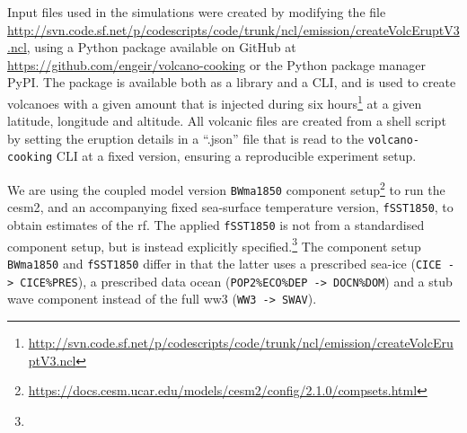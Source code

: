 \documentclass{ametsocV6.1}
\begin{document}





%



\appendix

\appendix[A]


Input files used in the simulations were created by modifying the file
\url{http://svn.code.sf.net/p/codescripts/code/trunk/ncl/emission/createVolcEruptV3.ncl},
using a Python package available on GitHub at
\url{https://github.com/engeir/volcano-cooking} or the Python package manager PyPI\@.
The package is available both as a library and a CLI, and is used to create volcanoes
with a given  amount that is injected during six
hours\footnote{\url{http://svn.code.sf.net/p/codescripts/code/trunk/ncl/emission/createVolcEruptV3.ncl}}
at a given latitude, longitude and altitude. All volcanic  files are created
from a shell script by setting the eruption details in a ``.json'' file that is read to
the \texttt{volcano-cooking} CLI at a fixed version, ensuring a reproducible experiment
setup.

We are using the coupled model version \texttt{BWma1850} component
setup\footnote{\url{https://docs.cesm.ucar.edu/models/cesm2/config/2.1.0/compsets.html}}
to run the \gls{cesm2}, and an accompanying fixed sea-surface temperature version,
\texttt{fSST1850}, to obtain estimates of the \gls{rf}. The applied \texttt{fSST1850} is
not from a standardised component setup, but is instead explicitly
specified.\footnote{\fssturl} The component setup \texttt{BWma1850} and
\texttt{fSST1850} differ in that the latter uses a prescribed sea-ice (\texttt{CICE ->
  CICE\%PRES}), a prescribed data ocean (\texttt{POP2\%ECO\%DEP -> DOCN\%DOM}) and a stub
wave component instead of the full \gls{ww3} (\texttt{WW3 -> SWAV}).
\end{document}
